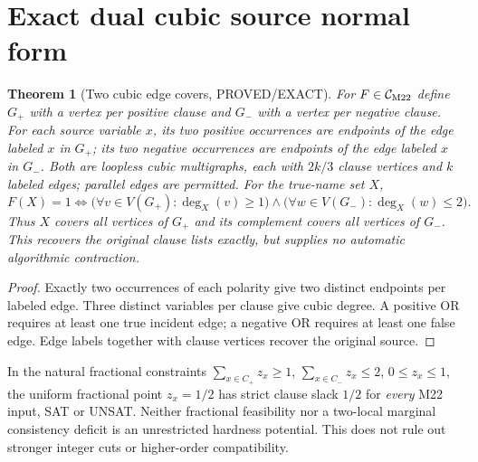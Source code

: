 \documentclass[11pt]{article}
\newtheorem{theorem}{Theorem}
\begin{document}
\section{Exact dual cubic source normal form}
\begin{theorem}[Two cubic edge covers, PROVED/EXACT]
For $F\in\mathcal C_{\rm M22}$ define $G_+$ with a vertex per positive clause and $G_-$ with a vertex per negative clause. For each source variable $x$, its two positive occurrences are endpoints of the edge labeled $x$ in $G_+$; its two negative occurrences are endpoints of the edge labeled $x$ in $G_-$. Both are loopless cubic multigraphs, each with $2k/3$ clause vertices and $k$ labeled edges; parallel edges are permitted. For the true-name set $X$,
\[
F(X)=1\iff
\big(\forall v\in V(G_+):\deg_{X}(v)\ge1\big)
\land\big(\forall w\in V(G_-):\deg_{X}(w)\le2\big).
\]
Thus $X$ covers all vertices of $G_+$ and its complement covers all vertices of $G_-$. This recovers the original clause lists exactly, but supplies no automatic algorithmic contraction.
\end{theorem}
\begin{proof}
Exactly two occurrences of each polarity give two distinct endpoints per labeled edge. Three distinct variables per clause give cubic degree. A positive OR requires at least one true incident edge; a negative OR requires at least one false edge. Edge labels together with clause vertices recover the original source.
\end{proof}
\par\noindent In the natural fractional constraints $\sum_{x\in C_+}z_x\ge1$, $\sum_{x\in C_-}z_x\le2$, $0\le z_x\le1$, the uniform fractional point $z_x=1/2$ has strict clause slack $1/2$ for \emph{every} M22 input, SAT or UNSAT. Neither fractional feasibility nor a two-local marginal consistency deficit is an unrestricted hardness potential. This does not rule out stronger integer cuts or higher-order compatibility.
\end{document}
